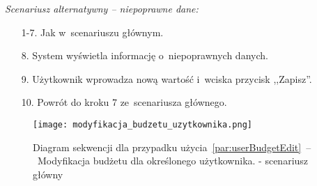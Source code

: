 \textit{Scenariusz alternatywny -- niepoprawne dane:}
\begin{enumerate}
  \item[1-7.] Jak w~scenariuszu głównym.
  \item[8.] System wyświetla informację o~niepoprawnych danych.
  \item[9.] Użytkownik wprowadza nową wartość i~wciska przycisk ,,Zapisz''.
  \item[10.] Powrót do kroku 7 ze~scenariusza głównego.
\end{enumerate}

\begin{figure}[H]
    \texttt{[image: modyfikacja\_budzetu\_uzytkownika.png]}
    \caption{Diagram sekwencji dla przypadku użycia~\ref{par:userBudgetEdit}~--~Modyfikacja budżetu dla określonego użytkownika.
    - scenariusz główny}
\end{figure}

